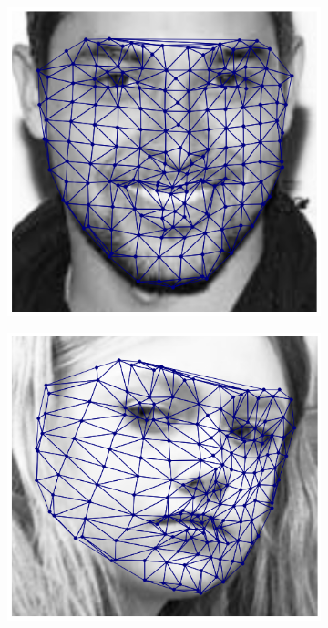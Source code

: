 \begin{figure}[!h]
\begin{subfigure}[b]{0.115\textwidth}
    \end{subfigure}
    \begin{subfigure}[b]{0.115\textwidth}
            \includegraphics[height=1\textwidth]{supports/Fittings/fitting_face_0016}
    \end{subfigure}
    \begin{subfigure}[b]{0.115\textwidth}
            \includegraphics[height=1\textwidth]{supports/Fittings/fitting_face_0020}

\end{subfigure}
\end{figure}
